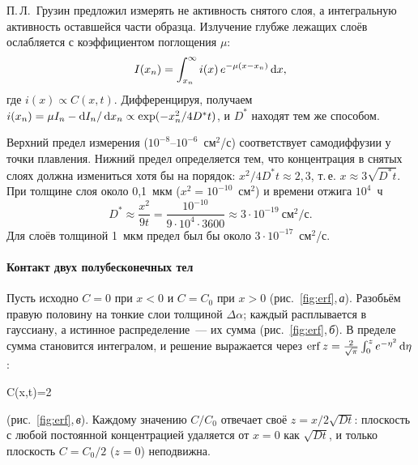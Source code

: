 \begin{podrobnee}
П.\,Л.~Грузин предложил измерять не активность снятого слоя, а
интегральную активность оставшейся части образца. Излучение глубже
лежащих слоёв ослабляется с коэффициентом поглощения $\mu$:
\[
I(x_n)=\int_{x_n}^\infty i(x)\,e^{-\mu(x-x_n)}\mathop{}\!\mathrm{d} x ,
\]
где $i(x)\propto C(x,t)$. Дифференцируя, получаем
$i(x_n)=\mu I_n-\mathop{}\!\mathrm{d} I_n/\mathop{}\!\mathrm{d} x_n\propto\exp(-x_n^2/4D^*t)$, и $D^*$
находят тем же способом.

Верхний предел измерения ($10^{-8}$--$10^{-6}$~см$^2$/с) соответствует
самодиффузии у точки плавления. Нижний предел определяется тем, что
концентрация в снятых слоях должна измениться хотя бы на порядок:
$x^2/4D^*t\approx2{,}3$, т.\,е. $x\approx3\sqrt{D^*t}$. При толщине слоя
около 0,1~мкм\isprmark{} ($x^2=10^{-10}$~см$^2$) и времени отжига $10^4$~ч
\[
D^*\approx\frac{x^2}{9t}=\frac{10^{-10}}{9\cdot10^4\cdot3600}\approx3\cdot10^{-19}~\text{см}^2/\text{с}.
\]
Для слоёв толщиной 1~мкм предел был бы около
$3\cdot10^{-17}$~см$^2$/с.
\end{podrobnee}

\paragraph{Контакт двух полубесконечных тел}
Пусть исходно $C=0$ при $x<0$ и $C=C_0$ при $x>0$ (рис.~\ref{fig:erf},\,\textit{а}).
Разобьём правую половину на тонкие слои толщиной $\Delta\alpha$; каждый
расплывается в гауссиану, а истинное распределение~— их сумма
(рис.~\ref{fig:erf},\,\textit{б}). В пределе сумма становится интегралом,
и решение выражается через 
$\operatorname{erf}z=\frac2{\sqrt\pi}\int_0^ze^{-\eta^2}\mathop{}\!\mathrm{d}\eta$:
\begin{keyeq}\label{eq:erf}
C(x,t)=2
\end{keyeq}
(рис.~\ref{fig:erf},\,\textit{в}). Каждому значению $C/C_0$
отвечает своё $z=x/2\sqrt{Dt}$: плоскость с любой постоянной
концентрацией удаляется от $x=0$ как $\sqrt{Dt}$, и только плоскость
$C=C_0/2$ ($z=0$) неподвижна.

